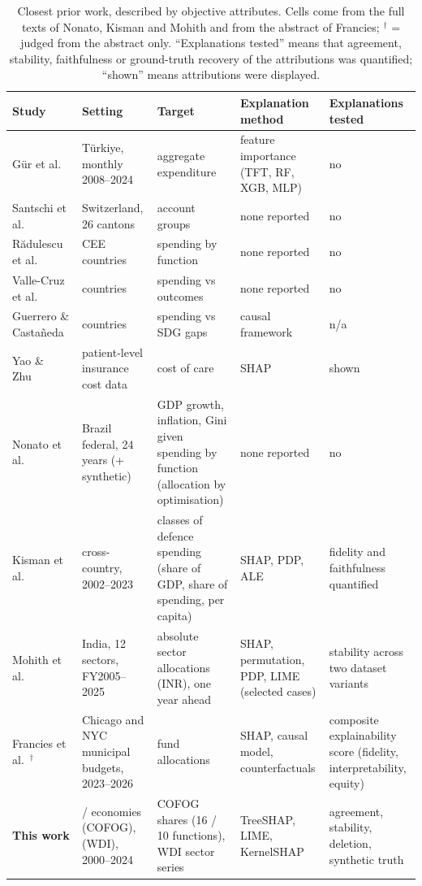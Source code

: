 \begin{table}[!t]
\caption{Closest prior work, described by objective attributes. Cells come from the full texts of Nonato, Kisman and Mohith and from the abstract of Francies; $^{\dagger}$ = judged from the abstract only. ``Explanations tested'' means that agreement, stability, faithfulness or ground-truth recovery of the attributions was quantified; ``shown'' means attributions were displayed.}\label{tab:gap}
\centering\footnotesize\setlength{\tabcolsep}{3pt}
\renewcommand{\arraystretch}{1.15}
\begin{tabular}{@{}>{\raggedright\arraybackslash}p{2.7cm}>{\raggedright\arraybackslash}p{3.1cm}>{\raggedright\arraybackslash}p{2.7cm}>{\raggedright\arraybackslash}p{2.3cm}>{\raggedright\arraybackslash}p{1.9cm}@{}}
\toprule
\textbf{Study} & \textbf{Setting} & \textbf{Target} & \textbf{Explanation method} & \textbf{Explanations tested}\\
\midrule
G\"ur et al.~\cite{gur2025} & T\"urkiye, monthly 2008--2024 & aggregate expenditure & feature importance (TFT, RF, XGB, MLP) & no\\
Santschi et al.~\cite{santschi2024} & Switzerland, 26 cantons & account groups & none reported & no\\
R\u{a}dulescu et al.~\cite{radulescu2015} & 5 CEE countries & spending by function & none reported & no\\
Valle-Cruz et al.~\cite{valle2022} & 217 countries & spending vs outcomes & none reported & no\\
Guerrero \& Casta\~neda~\cite{guerrero2022} & 140 countries & spending vs SDG gaps & causal framework & n/a\\
Yao \& Zhu~\cite{yao2025} & patient-level insurance cost data & cost of care & SHAP & shown\\
Nonato et al.~\cite{nonato2026} & Brazil federal, 24 years (+ synthetic) & GDP growth, inflation, Gini given spending by function (allocation by optimisation) & none reported & no\\
Kisman et al.~\cite{kisman2026} & cross-country, 2002--2023 & classes of defence spending (share of GDP, share of spending, per capita) & SHAP, PDP, ALE & fidelity and faithfulness quantified\\
Mohith et al.~\cite{mohith2026} & India, 12 sectors, FY2005--2025 & absolute sector allocations (INR), one year ahead & SHAP, permutation, PDP, LIME (selected cases) & stability across two dataset variants\\
Francies et al.~\cite{francies2026}$^{\dagger}$ & Chicago and NYC municipal budgets, 2023--2026 & fund allocations & SHAP, causal model, counterfactuals & composite explainability score (fidelity, interpretability, equity)\\
\midrule
\textbf{This work} & \NCofogCountries{} / \NTenEcon{} economies (COFOG), \NWdiCountries{} (WDI), 2000--2024 & COFOG shares (16 / 10 functions), WDI sector series & TreeSHAP, LIME, KernelSHAP & agreement, stability, deletion, synthetic truth\\
\bottomrule
\end{tabular}
\end{table}
